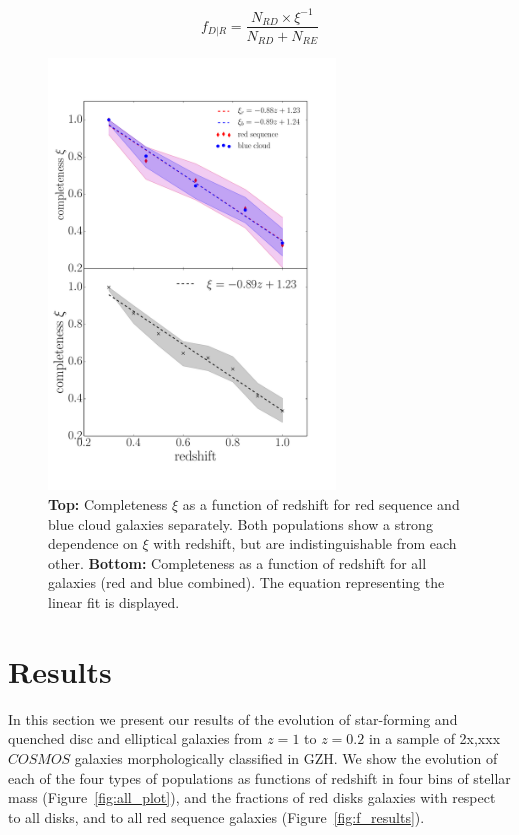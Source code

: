 \documentclass[useAMS,usenatbib]{mn2e}
\begin{document}
\begin{equation}
f_{D|R}=\frac{N_{RD}\times \xi^{-1}}{N_{RD} + N_{RE}}
\label{eqn:frid}
\end{equation}


\begin{figure}
\centering
\includegraphics[width=3in,trim={0cm 2cm 2cm 1cm},clip]{figures/completenessmoneyplot.pdf}
\caption{\textbf{Top:} Completeness $\xi$ as a function of redshift for red sequence and blue cloud  galaxies separately. Both populations show a strong dependence on $\xi$ with redshift, but are indistinguishable from each other. \textbf{Bottom:} Completeness as a function of redshift for all   galaxies (red and blue combined). The equation representing the linear fit is displayed.}
\label{fig:xi}
\end{figure}

\section{Results}
\label{sec:results}
In this section we present our results of the evolution of star-forming and quenched disc and elliptical galaxies from $z=1$ to $z=0.2$ in a sample of 2x,xxx $COSMOS$ galaxies morphologically classified in GZH. We show the evolution of each of the four types of populations as functions of redshift in four bins of stellar mass (Figure~\ref{fig:all_plot}), and the fractions of red disks galaxies with respect to all disks, and to all red sequence galaxies (Figure~\ref{fig:f_results}).
\end{document}
